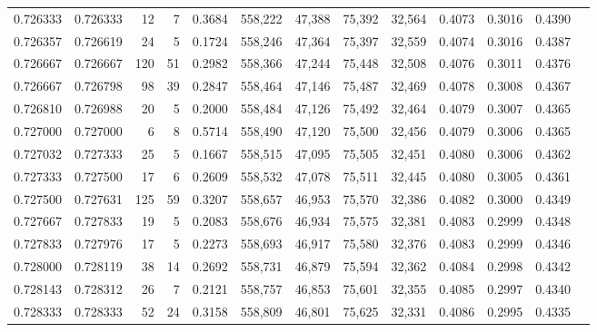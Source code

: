 \begin{tabular}{rrrrrrrrrrrrr}
0.726333 & 0.726333 &    12 &   7 &                                     0.3684 & 558,222 &  47,388 &  75,392 &  32,564 & 0.4073 & 0.3016 & 0.4390 \\
0.726357 & 0.726619 &    24 &   5 &                                     0.1724 & 558,246 &  47,364 &  75,397 &  32,559 & 0.4074 & 0.3016 & 0.4387 \\
0.726667 & 0.726667 &   120 &  51 &                                     0.2982 & 558,366 &  47,244 &  75,448 &  32,508 & 0.4076 & 0.3011 & 0.4376 \\
0.726667 & 0.726798 &    98 &  39 &                                     0.2847 & 558,464 &  47,146 &  75,487 &  32,469 & 0.4078 & 0.3008 & 0.4367 \\
0.726810 & 0.726988 &    20 &   5 &                                     0.2000 & 558,484 &  47,126 &  75,492 &  32,464 & 0.4079 & 0.3007 & 0.4365 \\
0.727000 & 0.727000 &     6 &   8 &                                     0.5714 & 558,490 &  47,120 &  75,500 &  32,456 & 0.4079 & 0.3006 & 0.4365 \\
0.727032 & 0.727333 &    25 &   5 &                                     0.1667 & 558,515 &  47,095 &  75,505 &  32,451 & 0.4080 & 0.3006 & 0.4362 \\
0.727333 & 0.727500 &    17 &   6 &                                     0.2609 & 558,532 &  47,078 &  75,511 &  32,445 & 0.4080 & 0.3005 & 0.4361 \\
0.727500 & 0.727631 &   125 &  59 &                                     0.3207 & 558,657 &  46,953 &  75,570 &  32,386 & 0.4082 & 0.3000 & 0.4349 \\
0.727667 & 0.727833 &    19 &   5 &                                     0.2083 & 558,676 &  46,934 &  75,575 &  32,381 & 0.4083 & 0.2999 & 0.4348 \\
0.727833 & 0.727976 &    17 &   5 &                                     0.2273 & 558,693 &  46,917 &  75,580 &  32,376 & 0.4083 & 0.2999 & 0.4346 \\
0.728000 & 0.728119 &    38 &  14 &                                     0.2692 & 558,731 &  46,879 &  75,594 &  32,362 & 0.4084 & 0.2998 & 0.4342 \\
0.728143 & 0.728312 &    26 &   7 &                                     0.2121 & 558,757 &  46,853 &  75,601 &  32,355 & 0.4085 & 0.2997 & 0.4340 \\
0.728333 & 0.728333 &    52 &  24 &                                     0.3158 & 558,809 &  46,801 &  75,625 &  32,331 & 0.4086 & 0.2995 & 0.4335 \\

\end{tabular}
